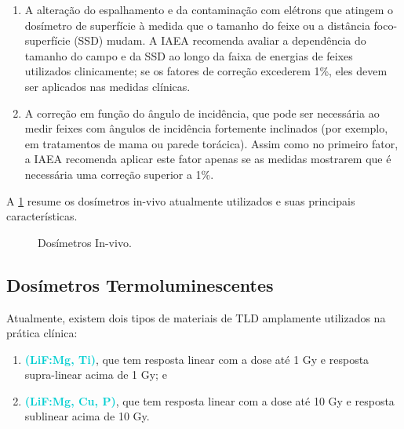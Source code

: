 \documentclass[11pt,a4paper]{article}
\newcounter{exemplo}
\begin{document}
	\begin{enumerate}
		\item A alteração do espalhamento e da contaminação com elétrons que atingem o dosímetro de superfície à medida que o tamanho do feixe ou a distância foco-superfície (SSD) mudam. A IAEA recomenda avaliar a dependência do tamanho do campo e da SSD ao longo da faixa de energias de feixes utilizados clinicamente; se os fatores de correção excederem 1\%, eles devem ser aplicados nas medidas clínicas.
		
		\item A correção em função do ângulo de incidência, que pode ser necessária ao medir feixes com ângulos de incidência fortemente inclinados (por exemplo, em tratamentos de mama ou parede torácica). Assim como no primeiro fator, a IAEA recomenda aplicar este fator apenas se as medidas mostrarem que é necessária uma correção superior a 1\%.
	\end{enumerate}
	
	A \ref{fig:dosimetrosInVivo} resume os dosímetros in-vivo atualmente utilizados e suas principais características.

	\begin{figure}[h]
		\centering
		\caption{Dosímetros In-vivo.}
		\label{fig:dosimetrosInVivo}
	\end{figure}



\subsection{Dosímetros Termoluminescentes}

	Atualmente, existem dois tipos de materiais de TLD amplamente utilizados na prática clínica:
	
	\begin{enumerate}[label=\textcolor{CarnationPink}{\arabic*${}^\circ $}]
		\item \textcolor{DarkTurquoise}{\textbf{(LiF:Mg, Ti)}}, que tem resposta linear com a dose até 1 Gy e resposta supra-linear acima de 1 Gy; e
		\item \textcolor{DarkTurquoise}{\textbf{(LiF:Mg, Cu, P)}}, que tem resposta linear com a dose até 10 Gy e resposta sublinear acima de 10 Gy.
	\end{enumerate}
	
\end{document}
